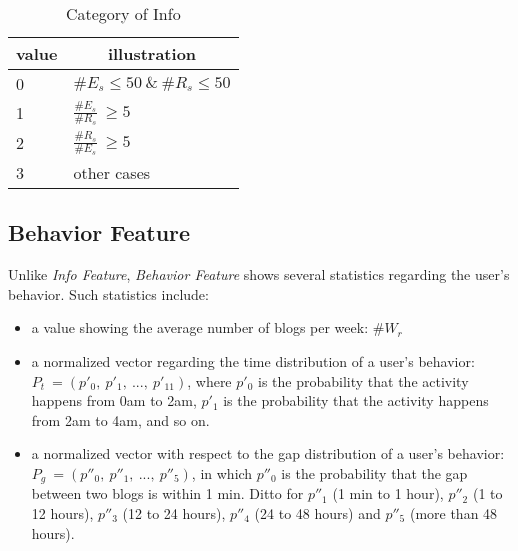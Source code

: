 

\begin{table}[!htb]
\centering
\begin{small}
\caption{Category of Info}
\vspace{0.3cm}
\label{tbl:ucate}
\begin{tabular}{ll}
\toprule
\multicolumn{1}{c}{\textbf{value}} & \multicolumn{1}{c}{\textbf{illustration}}	\\	\midrule \midrule
0                       & $\#E_s \le 50 \ \& \ \#R_s \le 50$				\\	\midrule
\multirow{2}{*}{1}      & \multirow{2}{*}{$\frac{\#E_s}{\#R_s} \ \ge 5$}	\\
 						&                       									\\	\midrule
\multirow{2}{*}{2}		& \multirow{2}{*}{$\frac{\#R_s}{\#E_s} \ \ge 5$}  \\
						&															\\	\midrule
3                   	& other cases 												\\ \bottomrule
\end{tabular}
\end{small}
\end{table}


\subsection{Behavior Feature}

Unlike \textit{Info Feature}, \textit{Behavior Feature} shows several statistics regarding the user's \retg{} behavior.
Such statistics include:
\begin{itemize}
	\item a value showing the average number of \retd{} blogs per week: $\#W_r$
	\item a normalized vector regarding the time distribution of a user's \retg{} behavior: $P_t\ = (p'_0,\ p'_1,\ ...,\ p'_{11})$, where $p'_0$ is the probability that the \retg{} activity happens from 0am to 2am, $p'_1$ is the probability that the \retg{} activity happens from 2am to 4am, and so on.
	\item a normalized vector with respect to the gap distribution of a user's \retg{} behavior: $P_g\ = (p''_0,\ p''_1,\ ...,\ p''_{5})$, in which $p''_0$ is the probability that the gap between two \retd{} blogs is within 1 min. Ditto for $p''_1$ (1 min to 1 hour), $p''_2$ (1 to 12 hours), $p''_3$ (12 to 24 hours), $p''_4$ (24 to 48 hours) and  $p''_5$ (more than 48 hours).
\end{itemize}

